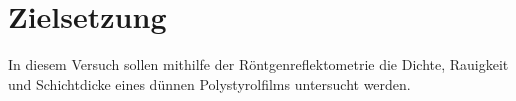 \section{Zielsetzung}
In diesem Versuch sollen mithilfe der Röntgenreflektometrie die Dichte, Rauigkeit und Schichtdicke eines dünnen Polystyrolfilms untersucht werden.